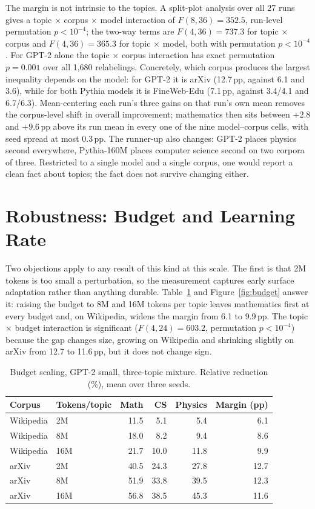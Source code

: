 \documentclass[11pt]{article}
\begin{document}
The margin is not intrinsic to the topics. A split-plot analysis over all 27
runs gives a topic $\times$ corpus $\times$ model interaction of
$F(8,36)=352.5$, run-level permutation $p<10^{-4}$; the two-way terms are
$F(4,36)=737.3$ for topic $\times$ corpus and $F(4,36)=365.3$ for topic
$\times$ model, both with permutation $p<10^{-4}$. For GPT-2 alone the
topic $\times$ corpus interaction has exact permutation $p=0.001$ over all
1,680 relabelings. Concretely, which corpus
produces the largest inequality depends on the model: for GPT-2 it is arXiv
(12.7\,pp, against 6.1 and 3.6), while for both Pythia models it is
FineWeb-Edu (7.1\,pp, against 3.4/4.1 and 6.7/6.3). Mean-centering each
run's three gains on that run's own mean removes the corpus-level shift in
overall improvement; mathematics then sits between $+2.8$ and $+9.6$\,pp
above its run mean in every one of the nine model--corpus cells, with seed
spread at most 0.3\,pp. The runner-up also changes: GPT-2 places physics second everywhere, Pythia-160M places computer
science second on two corpora of three. Restricted to a single model and a
single corpus, one would report a clean fact about topics; the fact does not
survive changing either.

\section{Robustness: Budget and Learning Rate}
\label{sec:robust}

Two objections apply to any result of this kind at this scale. The first is
that 2M tokens is too small a perturbation, so the measurement captures
early surface adaptation rather than anything durable. Table~\ref{tab:e3} and Figure~\ref{fig:budget}
answer it: raising the budget to 8M and 16M tokens per topic leaves
mathematics first at every budget and, on Wikipedia, widens the margin from
6.1 to 9.9\,pp. The topic $\times$ budget interaction is significant
($F(4,24)=603.2$, permutation $p<10^{-4}$) because the gap changes size,
growing on Wikipedia and shrinking slightly on arXiv from 12.7 to
11.6\,pp, but it does not change sign.

\begin{table}[t]
\centering
\caption{Budget scaling, GPT-2 small, three-topic mixture. Relative
reduction (\%), mean over three seeds.}
\label{tab:e3}
\small
\begin{tabular}{llrrrr}
\toprule
Corpus & Tokens/topic & Math & CS & Physics & Margin (pp) \\
\midrule
Wikipedia & 2M  & 11.5 & 5.1 & 5.4 & 6.1 \\
Wikipedia & 8M  & 18.0 & 8.2 & 9.4 & 8.6 \\
Wikipedia & 16M & 21.7 & 10.0 & 11.8 & 9.9 \\
arXiv     & 2M  & 40.5 & 24.3 & 27.8 & 12.7 \\
arXiv     & 8M  & 51.9 & 33.8 & 39.5 & 12.3 \\
arXiv     & 16M & 56.8 & 38.5 & 45.3 & 11.6 \\
\bottomrule
\end{tabular}
\end{table}
\end{document}
